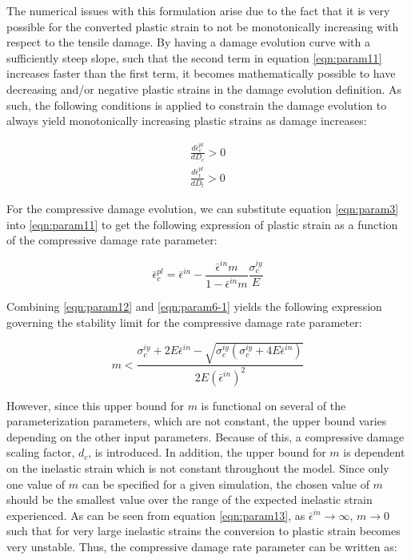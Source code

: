 The numerical issues with this formulation arise due to the fact that it is very possible for the converted plastic strain to not be monotonically increasing with respect to the tensile damage. By having a damage evolution curve with a sufficiently steep slope, such that the second term in equation \ref{eqn:param11} increases faster than the first term, it becomes mathematically possible to have decreasing and/or negative plastic strains in the damage evolution definition. As such, the following conditions is applied to constrain the damage evolution to always yield monotonically increasing plastic strains as damage increases:

\begin{equation}
\label{eqn:param6-1}
\begin{array}{c}
\frac{d\bar{\epsilon}_{c}^{pl}}{dD_{c}}>0\\
\frac{d\bar{\epsilon}_{t}^{pl}}{dD_{t}}>0
\end{array}
\end{equation}


For the compressive damage evolution, we can substitute equation \ref{eqn:param3} into \ref{eqn:param11} to get the following expression of plastic strain as a function of the compressive damage rate parameter:

\begin{equation}
\bar{\epsilon}_{c}^{pl}=\bar{\epsilon}^{in}-\frac{\bar{\epsilon}^{in}m}{1-\bar{\epsilon}^{in}m}\frac{\sigma_{c}^{iy}}{E}\label{eqn:param12}
\end{equation}

Combining \ref{eqn:param12} and \ref{eqn:param6-1} yields the following expression governing the stability limit for the compressive damage rate parameter:

\begin{equation}
m<\frac{\sigma_{c}^{iy}+2E\bar{\epsilon}^{in}-\sqrt{\sigma_{c}^{iy}\left(\sigma_{c}^{iy}+4E\bar{\epsilon}^{in}\right)}}{2E\left(\bar{\epsilon}^{in}\right)^{2}}\label{eqn:param13}
\end{equation}

However, since this upper bound for $m$ is functional on several of the parameterization parameters, which are not constant, the upper bound varies depending on the other input parameters. Because of this, a compressive damage scaling factor, $d_c$, is introduced. In addition, the upper bound for $m$ is dependent on the inelastic strain which is not constant throughout the model. Since only one value of $m$ can be specified for a given simulation, the chosen value of $m$ should be the smallest value over the range of the expected inelastic strain experienced. As can be seen from equation \ref{eqn:param13}, as $\bar{\epsilon}^{in} \rightarrow \infty$, $m\rightarrow0$ such that for very large inelastic strains the conversion to plastic strain becomes very unstable. Thus, the compressive damage rate parameter can be written as:

